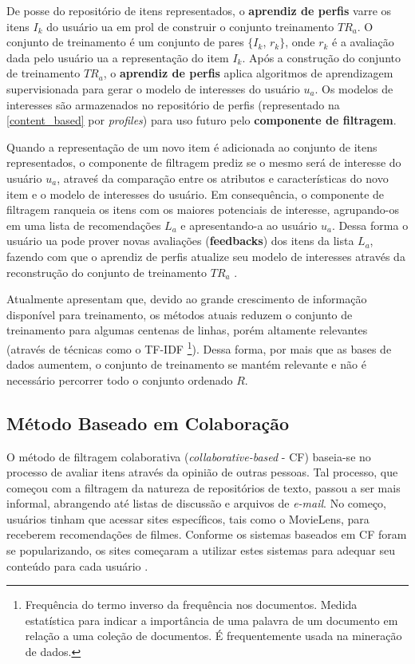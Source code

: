 \documentclass[12pt, openright, oneside, a4paper, brazil]{abntex2}
\begin{document}
De posse do repositório de itens representados, o \textbf{aprendiz de perfis} varre os itens $I_{k}$ do usuário ua em prol de construir o conjunto treinamento $TR_{a}$. O conjunto de treinamento é um conjunto de pares $\lbrace I_{k}$, $r_{k} \rbrace$, onde $r_{k}$ é a avaliação dada pelo usuário ua a representação do item $I_{k}$. Após a construção do conjunto de treinamento $TR_{a}$, o \textbf{aprendiz de perfis} aplica algoritmos de aprendizagem supervisionada para gerar o modelo de interesses do usuário $u_{a}$. Os modelos de interesses são armazenados no repositório de perfis (representado na \autoref{content_based} por \textit{profiles}) para uso futuro pelo \textbf{componente de filtragem}.

Quando a representação de um novo item é adicionada ao conjunto de itens representados, o componente de filtragem prediz se o mesmo será de interesse do usuário $u_{a}$, atraveś da comparação entre os atributos e características do novo item e o modelo de interesses do usuário. Em consequência, o componente de filtragem ranqueia os itens com os maiores potenciais de interesse, agrupando-os em uma lista de recomendações $L_{a}$ e apresentando-a ao usuário $u_{a}$. Dessa forma o usuário ua pode prover novas avaliações (\textbf{feedbacks}) dos itens da lista $L_{a}$, fazendo com que o aprendiz de perfis atualize seu modelo de interesses através da reconstrução do conjunto de treinamento $TR_{a}$ \cite{lops2011content}.

Atualmente  apresentam que, devido ao grande crescimento de informação disponível para treinamento, os métodos atuais reduzem o conjunto de treinamento para algumas centenas de linhas, porém altamente relevantes (através de técnicas como o TF-IDF \footnote{Frequência do termo inverso da frequência nos documentos. Medida estatística para indicar a importância de uma palavra de um documento em relação a uma coleção de documentos. É frequentemente usada na mineração de dados.}). Dessa forma, por mais que as bases de dados aumentem, o conjunto de treinamento se mantém relevante e não é necessário percorrer todo o conjunto ordenado $R$.

\subsection{Método Baseado em Colaboração}

O método de filtragem colaborativa (\textit{collaborative-based} - CF) baseia-se no processo de avaliar itens através da opinião de outras pessoas. Tal processo, que começou com a filtragem da natureza de repositórios de texto, passou a ser mais informal, abrangendo até listas de discussão e arquivos de \textit{e-mail}. No começo, usuários tinham que acessar sites específicos, tais como o MovieLens, para receberem recomendações de filmes. Conforme os sistemas baseados em CF foram se popularizando, os sites começaram a utilizar estes sistemas para adequar seu conteúdo para cada usuário \cite{schafer2007collaborative}.
\end{document}
